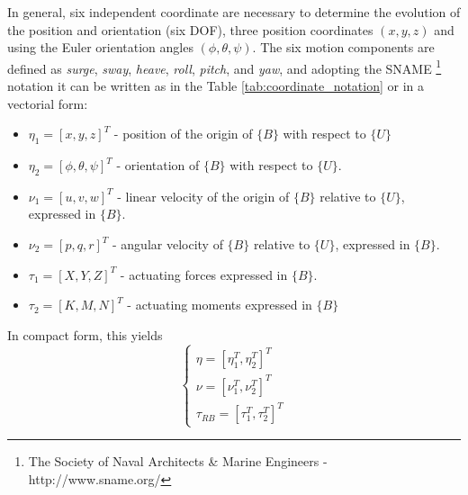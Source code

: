 \par In general, six independent coordinate are necessary to determine the evolution of the position and orientation (six \ac{DOF}), three position coordinates $(x,y,z)$ and using the Euler orientation angles $(\phi, \theta, \psi)$. The six motion components are defined as \textit{surge}, \textit{sway}, \textit{heave}, \textit{roll}, \textit{pitch}, and \textit{yaw}, and adopting the SNAME \footnote{The Society of Naval Architects \& Marine Engineers - http://www.sname.org/} notation it can be written as in the Table \ref{tab:coordinate_notation} or in a vectorial form: 
\begin{itemize}
    \item $\eta_1 = [x,y,z]^T$ - position of the origin of $\{B\}$ with respect to $\{U\}$
    \item $\eta_2 = [\phi, \theta, \psi]^T$ - orientation of $\{B\}$ with respect to $\{U\}$.
    \item $\nu_1 = [u,v,w]^T$ - linear velocity of the origin of $\{B\}$ relative to $\{U\}$, expressed in $\{B\}$.
    \item $\nu_2 = [p,q,r]^T$ - angular velocity of $\{B\}$ relative to $\{U\}$, expressed in $\{B\}$.
    \item $\tau_1 = [X,Y,Z]^T$ - actuating forces expressed in $\{B\}$.
    \item $\tau_2 = [K,M,N]^T$ - actuating moments expressed in $\{B\}$
\end{itemize}
In compact form, this yields
\begin{equation}
    \begin{cases}
        \eta = [\eta_1^T, \eta_2^T]^T \\
        \nu = [\nu_1^T, \nu_2^T]^T \\
        \tau_{RB} = [\tau_1^T, \tau_2^T]^T
    \end{cases}
\end{equation}

